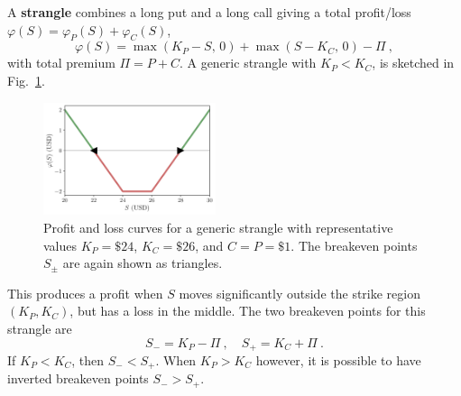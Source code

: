 \documentclass[aps,reprint]{revtex4-2}
\begin{document}
A \textbf{strangle} combines a long put and a long call giving a total profit/loss
$\varphi(S)= \varphi_P(S) + \varphi_C(S)$,
\begin{equation}
\varphi(S) = \max(K_P - S,\,0) + \max(S - K_C,\,0) - \Pi~,
\end{equation}
with total premium $\Pi = P + C$.  
A generic strangle with $K_P < K_C$, is sketched in Fig.~\ref{fig:strangle}.
\begin{figure}[hb]
    \centering
    \includegraphics[width=0.45\textwidth]{figs/strangle.pdf}
    \caption{Profit and loss curves for a generic strangle with representative values
    $K_P = \$24$, $K_C = \$26$, and $C = P = \$1$.
    The breakeven points $S_\pm$ are again shown as triangles.}
    \label{fig:strangle}
\end{figure}
This produces a profit when $S$ moves significantly outside the strike region $(K_P, K_C)$, but has a loss in the middle. 
The two breakeven points for this strangle are
\begin{equation}
S_{-} = K_P - \Pi~, 
\quad 
S_{+} = K_C + \Pi~.
\end{equation}
If $K_P < K_C$, then $S_{-} < S_{+}$.  When $K_P > K_C$ however, it is possible to have inverted breakeven points $S_{-} > S_{+}$.
\end{document}
